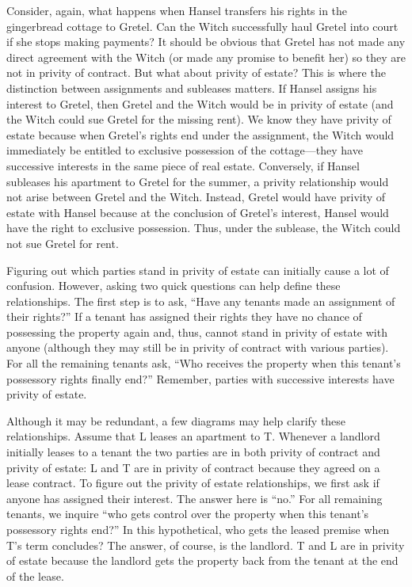 Consider, again, what happens when Hansel transfers his rights in the
gingerbread cottage to Gretel.  Can the Witch successfully haul Gretel into
court if she stops making payments?  It should be obvious that Gretel has not
made any direct agreement with the Witch (or made any promise to benefit her)
so they are not in privity of contract.  But what about privity of estate? 
This is where the distinction between assignments and subleases matters.  If
Hansel assigns his interest to Gretel, then Gretel and the Witch would be in
privity of estate (and the Witch could sue Gretel for the missing rent).  We
know they have privity of estate because when Gretel's rights end under the
assignment, the Witch would immediately be entitled to exclusive possession of
the cottage---they have successive interests in the same piece of real estate. 
Conversely, if Hansel subleases his apartment to Gretel for the summer, a
privity relationship would not arise between Gretel and the Witch.  Instead,
Gretel would have privity of estate with Hansel because at the conclusion of
Gretel's interest, Hansel would have the right to exclusive possession.  Thus,
under the sublease, the Witch could not sue Gretel for rent.

Figuring out which parties stand in privity of estate can initially cause a lot
of confusion.  However, asking two quick questions can help define these
relationships.  The first step is to ask, ``Have any tenants made an assignment
of their rights?''  If a tenant has assigned their rights they have no chance
of possessing the property again and, thus, cannot stand in privity of estate
with anyone (although they may still be in privity of contract with various
parties).  For all the remaining tenants ask, ``Who receives the property when
this tenant's possessory rights finally end?''  Remember, parties with
successive interests have privity of estate. 

Although it may be redundant, a few diagrams may help clarify these
relationships.  Assume that L leases an apartment to T.  Whenever a landlord
initially leases to a tenant the two parties are in both privity of contract
and privity of estate: 
L and T are in privity of contract because they agreed on a lease contract. To
figure out the privity of estate relationships, we first ask if anyone has
assigned their interest.  The answer here is ``no.''  For all remaining
tenants, we inquire ``who gets control over the property when this tenant's
possessory rights end?''  In this hypothetical, who gets the leased premise
when T's term concludes?  The answer, of course, is the landlord. T and L are
in privity of estate because the landlord gets the property back from the
tenant at the end of the lease.  

